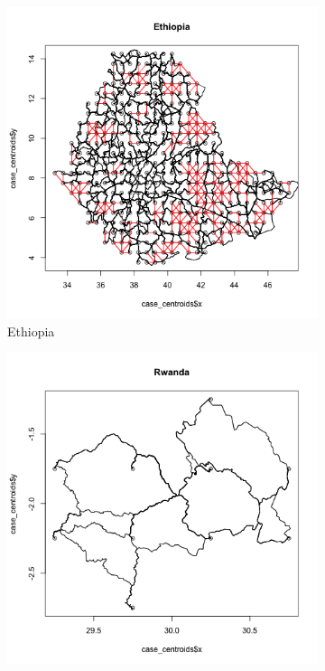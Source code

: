 \documentclass[11pt, oneside]{article}   	%
\begin{document}
\begin{figure}[t]
\begin{subfigure}[c]{0.43\textwidth}
\includegraphics[width=\textwidth, trim={1cm 1cm 0cm 2cm},clip]{../../Build/output/Road_Networks/network_Ethiopia.png}
\caption{Ethiopia}
\label{fig:Ethiopia_roads}
\end{subfigure}
\begin{subfigure}[c]{0.43\textwidth}
\includegraphics[width=\textwidth, trim={1cm 1cm 0cm 2cm},clip]{../../Build/output/Road_Networks/network_Rwanda.png}

\end{subfigure}
\end{figure}
\end{document}
